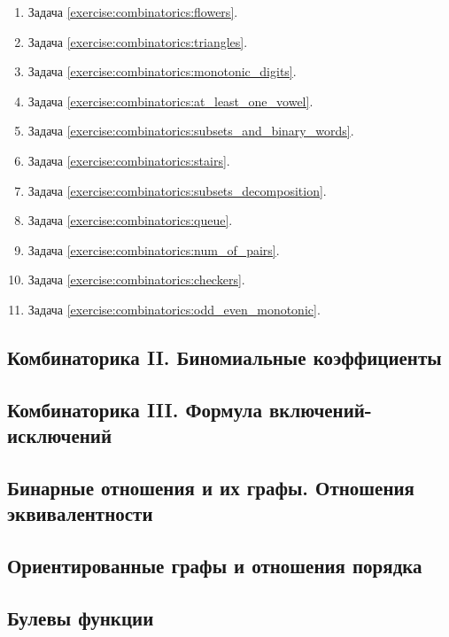 \begin{enumerate}[label=\textbf{№\arabic*}:]
    \item Задача \ref{exercise:combinatorics:flowers}.
    \item Задача \ref{exercise:combinatorics:triangles}.
    \item Задача \ref{exercise:combinatorics:monotonic_digits}.
    \item Задача \ref{exercise:combinatorics:at_least_one_vowel}.
    \item Задача \ref{exercise:combinatorics:subsets_and_binary_words}.
    \item Задача \ref{exercise:combinatorics:stairs}.
    \item Задача \ref{exercise:combinatorics:subsets_decomposition}.
    \item Задача \ref{exercise:combinatorics:queue}.
    \item Задача \ref{exercise:combinatorics:num_of_pairs}.
    \item Задача \ref{exercise:combinatorics:checkers}.
    \item Задача \ref{exercise:combinatorics:odd_even_monotonic}.
\end{enumerate}

\subsection*{Комбинаторика II. Биномиальные коэффициенты}

\subsection*{Комбинаторика III. Формула включений-исключений}

\subsection*{Бинарные отношения и их графы. Отношения эквивалентности}

\subsection*{Ориентированные графы и отношения порядка}

\subsection*{Булевы функции}

